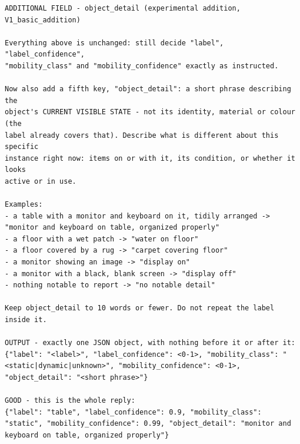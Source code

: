 \begin{lstlisting}[style=promptstyle]
ADDITIONAL FIELD - object_detail (experimental addition, V1_basic_addition)

Everything above is unchanged: still decide "label", "label_confidence",
"mobility_class" and "mobility_confidence" exactly as instructed.

Now also add a fifth key, "object_detail": a short phrase describing the
object's CURRENT VISIBLE STATE - not its identity, material or colour (the
label already covers that). Describe what is different about this specific
instance right now: items on or with it, its condition, or whether it looks
active or in use.

Examples:
- a table with a monitor and keyboard on it, tidily arranged -> "monitor and keyboard on table, organized properly"
- a floor with a wet patch -> "water on floor"
- a floor covered by a rug -> "carpet covering floor"
- a monitor showing an image -> "display on"
- a monitor with a black, blank screen -> "display off"
- nothing notable to report -> "no notable detail"

Keep object_detail to 10 words or fewer. Do not repeat the label inside it.

OUTPUT - exactly one JSON object, with nothing before it or after it:
{"label": "<label>", "label_confidence": <0-1>, "mobility_class": "<static|dynamic|unknown>", "mobility_confidence": <0-1>, "object_detail": "<short phrase>"}

GOOD - this is the whole reply:
{"label": "table", "label_confidence": 0.9, "mobility_class": "static", "mobility_confidence": 0.99, "object_detail": "monitor and keyboard on table, organized properly"}
\end{lstlisting}